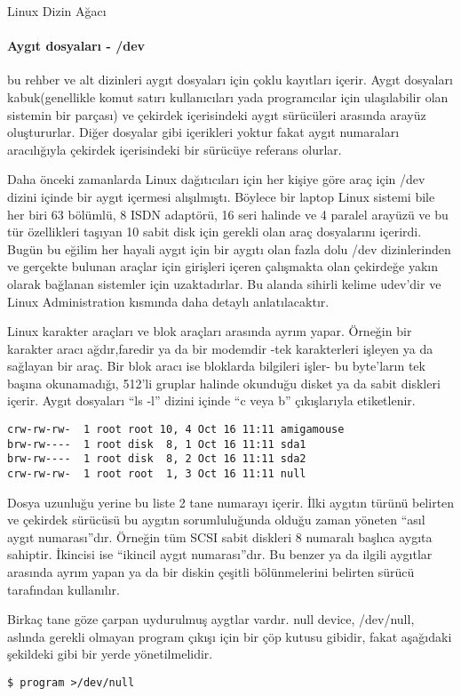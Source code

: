 \begin{section}{Linux Dizin Ağacı}
\paragraph{Aygıt dosyaları - /dev}{bu rehber ve alt dizinleri aygıt dosyaları için çoklu kayıtları içerir. Aygıt dosyaları kabuk(genellikle komut satırı kullanıcıları yada programcılar için ulaşılabilir olan sistemin bir parçası) ve çekirdek içerisindeki aygıt sürücüleri arasında arayüz oluştururlar. Diğer dosyalar gibi içerikleri yoktur fakat aygıt numaraları aracılığıyla çekirdek içerisindeki bir sürücüye referans olurlar.}

Daha önceki zamanlarda Linux dağıtıcıları için her kişiye göre araç için /dev dizini içinde bir aygıt içermesi alışılmıştı. Böylece bir laptop Linux sistemi bile her biri 63 bölümlü, 8 ISDN adaptörü, 16 seri halinde ve 4 paralel arayüzü ve bu tür özellikleri taşıyan 10 sabit disk için gerekli olan araç dosyalarını içerirdi. Bugün bu eğilim her hayali aygıt için bir aygıtı olan fazla dolu /dev dizinlerinden ve gerçekte bulunan araçlar için girişleri içeren çalışmakta olan çekirdeğe yakın olarak bağlanan sistemler için uzaktadırlar. Bu alanda sihirli kelime udev’dir ve Linux Administration kısmında daha detaylı anlatılacaktır.

Linux karakter araçları ve blok araçları arasında ayrım yapar. Örneğin bir karakter aracı ağdır,faredir ya da bir modemdir -tek karakterleri işleyen ya da sağlayan bir araç. Bir blok aracı ise bloklarda bilgileri işler- bu byte’ların tek başına okunamadığı, 512’li gruplar halinde okunduğu disket ya da sabit diskleri içerir. Aygıt dosyaları “ls -l” dizini içinde “c veya b” çıkışlarıyla etiketlenir.
\begin{verbatim}
crw-rw-rw-  1 root root 10, 4 Oct 16 11:11 amigamouse
brw-rw----  1 root disk  8, 1 Oct 16 11:11 sda1
brw-rw----  1 root disk  8, 2 Oct 16 11:11 sda2
crw-rw-rw-  1 root root  1, 3 Oct 16 11:11 null
\end{verbatim}

Dosya uzunluğu yerine bu liste 2 tane numarayı içerir. İlki aygıtın türünü belirten ve çekirdek sürücüsü bu aygıtın sorumluluğunda olduğu zaman yöneten “asıl aygıt numarası”dır. Örneğin tüm SCSI sabit diskleri 8 numaralı başlıca aygıta sahiptir. İkincisi ise “ikincil aygıt numarası”dır. Bu benzer ya da ilgili aygıtlar arasında ayrım yapan ya da bir diskin çeşitli bölünmelerini belirten sürücü tarafından kullanılır.

Birkaç tane göze çarpan uydurulmuş aygtlar vardır. null device, /dev/null, aslında gerekli olmayan program çıkışı için bir çöp kutusu gibidir, fakat aşağıdaki şekildeki gibi bir yerde yönetilmelidir.
\begin{verbatim}
$ program >/dev/null
\end{verbatim}


\end{section}
